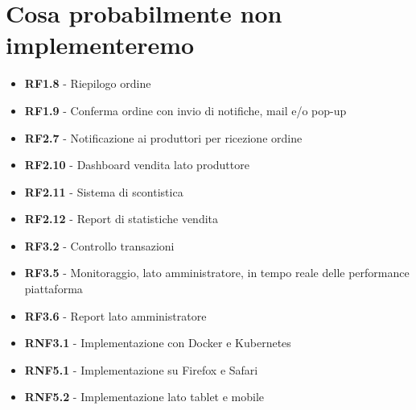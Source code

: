 \newpage

\section{Cosa probabilmente non implementeremo}

\begin{itemize}
    \item \textbf{RF1.8} - Riepilogo ordine
    \item \textbf{RF1.9} - Conferma ordine con invio di notifiche, mail e/o pop-up
    \item \textbf{RF2.7} - Notificazione ai produttori per ricezione ordine
    \item \textbf{RF2.10} - Dashboard  vendita lato produttore
    \item \textbf{RF2.11} - Sistema di scontistica
    \item \textbf{RF2.12} - Report di statistiche vendita
    \item \textbf{RF3.2} - Controllo transazioni
    \item \textbf{RF3.5} - Monitoraggio, lato amministratore, in tempo reale delle performance piattaforma
    \item \textbf{RF3.6} - Report lato amministratore
    \item \textbf{RNF3.1} - Implementazione con Docker e Kubernetes
    \item \textbf{RNF5.1} - Implementazione su Firefox e Safari
    \item \textbf{RNF5.2} - Implementazione lato tablet e mobile
\end{itemize}
